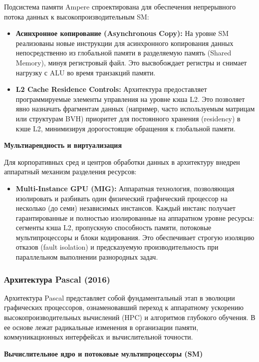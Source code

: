 \documentclass{article}[14pt]
\begin{document}
Подсистема памяти Ampere спроектирована для обеспечения непрерывного потока данных к высокопроизводительным SM:
\begin{itemize}
    \item \textbf{Асинхронное копирование (Asynchronous Copy):} На уровне SM реализованы новые инструкции для асинхронного копирования данных непосредственно из глобальной памяти в разделяемую память (Shared Memory), минуя регистровый файл. Это высвобождает регистры и снимает нагрузку с ALU во время транзакций памяти.
    \item \textbf{L2 Cache Residence Controls:} Архитектура предоставляет программируемые элементы управления на уровне кэша L2. Это позволяет явно назначать фрагментам данных (например, часто используемым матрицам или структурам BVH) приоритет для постоянного хранения (residency) в кэше L2, минимизируя дорогостоящие обращения к глобальной памяти.
\end{itemize}

\medskip \noindent \textbf{Мультиарендность и виртуализация}

Для корпоративных сред и центров обработки данных в архитектуру внедрен аппаратный механизм разделения ресурсов:
\begin{itemize}
    \item \textbf{Multi-Instance GPU (MIG):} Аппаратная технология, позволяющая изолировать и разбивать один физический графический процессор на несколько (до семи) независимых инстансов. Каждый инстанс получает гарантированные и полностью изолированные на аппаратном уровне ресурсы: сегменты кэша L2, пропускную способность памяти, потоковые мультипроцессоры и блоки кодирования. Это обеспечивает строгую изоляцию отказов (fault isolation) и предсказуемую производительность при параллельном выполнении разнородных задач.
\end{itemize}

\subsubsection{Архитектура Pascal (2016)}

Архитектура Pascal представляет собой фундаментальный этап в эволюции графических процессоров, ознаменовавший переход к аппаратному ускорению высокопроизводительных вычислений (HPC) и алгоритмов глубокого обучения. В ее основе лежат радикальные изменения в организации памяти, коммуникационных интерфейсах и вычислительной точности.

\medskip \noindent \textbf{Вычислительное ядро и потоковые мультипроцессоры (SM)}
\end{document}
